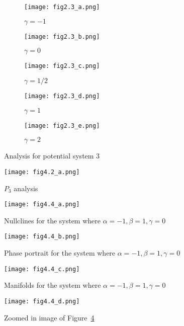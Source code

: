 \begin{figure}[H]
    \centering
    \begin{subfigure}{.32\textwidth}
        \centering
        \texttt{[image: fig2.3\_a.png]}
        \caption{$\gamma=-1$}
    \end{subfigure}
    \begin{subfigure}{.32\textwidth}
        \centering
        \texttt{[image: fig2.3\_b.png]}
        \caption{$\gamma=0$}
    \end{subfigure}
    \begin{subfigure}{.32\textwidth}
        \centering
        \texttt{[image: fig2.3\_c.png]}
        \caption{$\gamma=1/2$}
    \end{subfigure}
    \begin{subfigure}{.49\textwidth}
        \centering
        \texttt{[image: fig2.3\_d.png]}
        \caption{$\gamma=1$}
    \end{subfigure}
    \begin{subfigure}{.49\textwidth}
        \centering
        \texttt{[image: fig2.3\_e.png]}
        \caption{$\gamma=2$}
    \end{subfigure}
    \caption{Analysis for potential system 3}
    \label{fig:3}
\end{figure}

\begin{figure}[H]
    \centering
    \texttt{[image: fig4.2\_a.png]}
    \caption{$P_3$ analysis}
    \label{fig:4}
\end{figure}

\begin{figure}[H]
    \centering
    \texttt{[image: fig4.4\_a.png]}
    \caption{Nullclines for the system where $\alpha=-1,\beta=1,\gamma=0$}
    \label{fig:5}
\end{figure}
\begin{figure}[H]
    \centering
    \texttt{[image: fig4.4\_b.png]}
    \caption{Phase portrait for the system where $\alpha=-1,\beta=1,\gamma=0$}
    \label{fig:6}
\end{figure}
\begin{figure}[H]
    \centering
    \texttt{[image: fig4.4\_c.png]}
    \caption{Manifolds for the system where $\alpha=-1,\beta=1,\gamma=0$}
    \label{fig:7}
\end{figure}
\begin{figure}[H]
    \centering
    \texttt{[image: fig4.4\_d.png]}
    \caption{Zoomed in image of Figure~\ref{fig:6}}
    \label{fig:8}
\end{figure}

